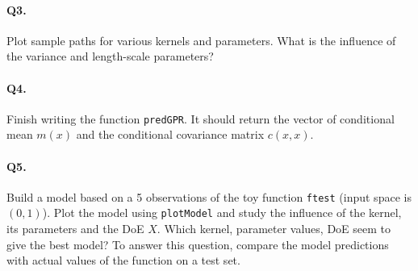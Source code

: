 \documentclass[12pt]{scrartcl}
\begin{document}
\paragraph{Q3.} Plot sample paths for various kernels and parameters. What is the influence of the variance and length-scale parameters?

\paragraph{Q4.} Finish writing the function \texttt{predGPR}. It should return the vector of conditional mean $m(x)$ and the conditional covariance matrix $c(x,x)$.

\paragraph{Q5.} Build a model based on a 5 observations of the toy function \texttt{ftest} (input space is $(0,1)$). Plot the model using \texttt{plotModel} and study the influence of the kernel, its parameters and the DoE $X$. Which kernel, parameter values, DoE seem to give the best model? To answer this question, compare the model predictions with actual values of the function on a test set.
\end{document}

